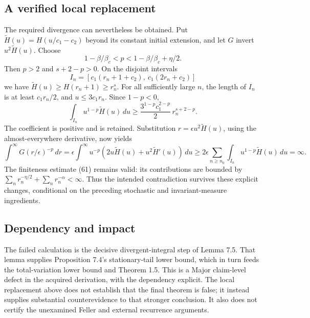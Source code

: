\documentclass[10pt]{article}
\begin{document}
\subsection*{A verified local replacement}
The required divergence can nevertheless be obtained. Put \(\widetilde H(u)=H(u/c_1-c_2)\) beyond its constant initial extension, and let \(G\) invert \(u^2\widetilde H(u)\). Choose \[1-\beta/\beta_c<p<1-\beta/\beta_c+\eta/2 .\] Then \(p>2\) and \(s+2-p>0\). On the disjoint intervals \[I_n=[c_1(r_n+1+c_2),\ c_1(2r_n+c_2)]\] we have \(\widetilde H(u)\ge H(r_n+1)\ge r_n^s\). For all sufficiently large \(n\), the length of \(I_n\) is at least \(c_1r_n/2\), and \(u\le3c_1r_n\). Since \(1-p<0\), \[\int_{I_n}u^{1-p}\widetilde H(u)\,du
 \ge \frac{3^{1-p}c_1^{2-p}}{2}\,r_n^{s+2-p}.\] The coefficient is positive and is retained. Substitution \(r=\epsilon u^2\widetilde H(u)\), using the almost-everywhere derivative, now yields \[\int^\infty G(r/\epsilon)^{-p}\,dr
 =\epsilon\int^\infty u^{-p}
       (2u\widetilde H(u)+u^2\widetilde H'(u))\,du
 \ge 2\epsilon\sum_{n\ge n_0}
       \int_{I_n}u^{1-p}\widetilde H(u)\,du
 =\infty.\] The finiteness estimate (61) remains valid: its contributions are bounded by \(\sum_n r_n^{-\eta/2}+\sum_n r_n^{-\alpha}<\infty\). Thus the intended contradiction survives these explicit changes, conditional on the preceding stochastic and invariant-measure ingredients.\par
\subsection*{Dependency and impact}
The failed calculation is the decisive divergent-integral step of Lemma 7.5. That lemma supplies Proposition 7.4’s stationary-tail lower bound, which in turn feeds the total-variation lower bound and Theorem 1.5. This is a Major claim-level defect in the acquired derivation, with the dependency explicit. The local replacement above does not establish that the final theorem is false; it instead supplies substantial counterevidence to that stronger conclusion. It also does not certify the unexamined Feller and external recurrence arguments.\par
\end{document}
